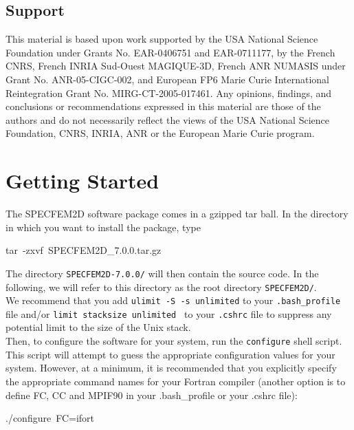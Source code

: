 \documentclass[oneside,english,onecolumn,letterpaper]{book}
\newenvironment{lyxcode}
{\begin{list}{}{
\setlength{\rightmargin}{\leftmargin}
\setlength{\listparindent}{0pt}%
\raggedright
\setlength{\itemsep}{0pt}
\setlength{\parsep}{0pt}
\normalfont\ttfamily}%
 \item[]}
{\end{list}}
\begin{document}
\section{Support}

This material is based upon work supported by the USA National Science
Foundation under Grants No. EAR-0406751 and EAR-0711177, by the French
CNRS, French INRIA Sud-Ouest MAGIQUE-3D, French ANR NUMASIS under
Grant No. ANR-05-CIGC-002, and European FP6 Marie Curie International
Reintegration Grant No. MIRG-CT-2005-017461.
Any opinions, findings, and conclusions or recommendations expressed in this material are
those of the authors and do not necessarily reflect the views of the
USA National Science Foundation, CNRS, INRIA, ANR or the European
Marie Curie program.




\chapter{\label{cha:Getting-Started}Getting Started}


The SPECFEM2D software package comes in a gzipped tar ball. In the
directory in which you want to install the package, type
\begin{lyxcode}
{\small tar~-zxvf~SPECFEM2D\_7.0.0.tar.gz}{\small \par}
\end{lyxcode}
The directory \texttt{SPECFEM2D-7.0.0/} will then contain
the source code. In the following, we will refer to this directory as the root directory \texttt{SPECFEM2D/}. \\

We recommend that you add {\texttt{ulimit -S -s unlimited}} to your {\texttt{.bash\_profile}} file and/or {\texttt{limit stacksize unlimited }} to your {\texttt{.cshrc}} file to suppress any potential limit to the size of the Unix stack.\\

Then, to configure the software for your system, run the
\texttt{configure} shell script. This script will attempt to guess
the appropriate configuration values for your system. However, at
a minimum, it is recommended that you explicitly specify the appropriate
command names for your Fortran compiler (another option is to define FC, CC and MPIF90 in your .bash\_profile
or your .cshrc file):
\begin{lyxcode}
./configure~FC=ifort~
\end{lyxcode}
\end{document}
